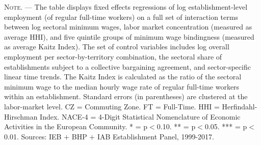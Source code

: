 \documentclass[11pt,oneside,reqno,xcolor=dvipsnames]{article} %
\begin{document}
\begin{appendix}
\begin{refsection}
\begin{table}[!ht]
{\begin{threeparttable}
\begin{tabular}{|C{10cm}|C{6cm}|}
\end{tabular}
\begin{tablenotes}
\item \footnotesize \textsc{Note. ---} The table displays fixed effects regressions of log establishment-level employment (of regular full-time workers) on a full set of interaction terms between log sectoral minimum wages, labor market concentration (measured as average HHI), and five quintile groups of minimum wage bindingness (measured as average Kaitz Index). The set of control variables includes log overall employment per sector-by-territory combination, the sectoral share of establishments subject to a collective bargaining agreement, and sector-specific linear time trends.  The Kaitz Index is calculated as the ratio of the sectoral minimum wage to the median hourly wage rate of regular full-time workers within an establishment. Standard errors (in parentheses) are clustered at the labor-market level. CZ = Commuting Zone. FT = Full-Time. HHI = Herfindahl-Hirschman Index. NACE-4 = 4-Digit Statistical Nomenclature of Economic Activities in the European Community. * = p$<$0.10. ** = p$<$0.05. *** = p$<$0.01. Sources: IEB $\plus$ BHP $\plus$ IAB Establishment Panel, 1999-2017.
\end{tablenotes}
\end{threeparttable}
}
\end{table}



\vspace*{2.5cm}
\vspace*{\fill}





\clearpage
\printbibliography[title=References for Online Appendix] %

\end{refsection}
\end{appendix}
\end{document}
